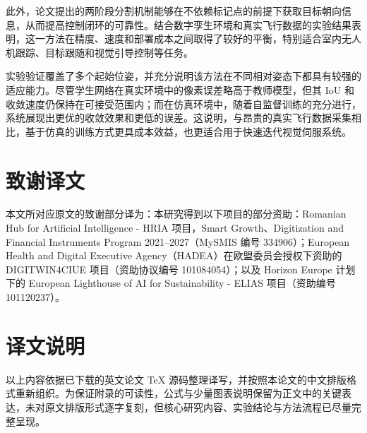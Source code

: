 此外，论文提出的两阶段分割机制能够在不依赖标记点的前提下获取目标朝向信息，从而提高控制闭环的可靠性。结合数字孪生环境和真实飞行数据的实验结果表明，这一方法在精度、速度和部署成本之间取得了较好的平衡，特别适合室内无人机跟踪、目标跟随和视觉引导控制等任务。

实验验证覆盖了多个起始位姿，并充分说明该方法在不同相对姿态下都具有较强的适应能力。尽管学生网络在真实环境中的像素误差略高于教师模型，但其 IoU 和收敛速度仍保持在可接受范围内；而在仿真环境中，随着自监督训练的充分进行，系统展现出更优的收敛效果和更低的误差。这说明，与昂贵的真实飞行数据采集相比，基于仿真的训练方式更具成本效益，也更适合用于快速迭代视觉伺服系统。

\section{致谢译文}
本文所对应原文的致谢部分译为：本研究得到以下项目的部分资助：Romanian Hub for Artificial Intelligence - HRIA 项目，Smart Growth、Digitization and Financial Instruments Program 2021--2027（MySMIS 编号 334906）；European Health and Digital Executive Agency（HADEA）在欧盟委员会授权下资助的 DIGITWIN4CIUE 项目（资助协议编号 101084054）；以及 Horizon Europe 计划下的 European Lighthouse of AI for Sustainability - ELIAS 项目（资助编号 101120237）。

\section{译文说明}
以上内容依据已下载的英文论文 TeX 源码整理译写，并按照本论文的中文排版格式重新组织。为保证附录的可读性，公式与少量图表说明保留为正文中的关键表达，未对原文排版形式逐字复刻，但核心研究内容、实验结论与方法流程已尽量完整呈现。



